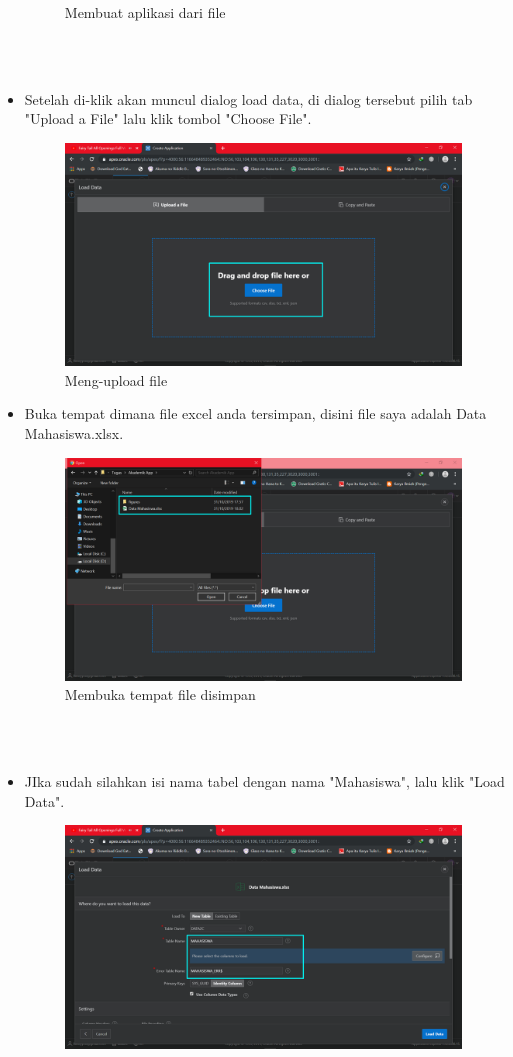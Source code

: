 \documentclass[12pt, times new roman]{article}
\begin{document}
\begin{itemize}
\begin{figure}[htbp]
	\caption{Membuat aplikasi dari file}
\end{figure}\\
\\
\item Setelah di-klik akan muncul dialog load data, di dialog tersebut pilih tab "Upload a File" lalu klik tombol "Choose File".
\begin{figure}[htbp]
	\centering
	\includegraphics[width=10.5cm]{figures/6.png}
	\caption{Meng-upload file}
\end{figure}
\item Buka tempat dimana file excel anda tersimpan, disini file saya adalah Data Mahasiswa.xlsx.
\begin{figure}[htbp]
	\centering
	\includegraphics[width=10.5cm]{figures/7.png}
	\caption{Membuka tempat file disimpan}
\end{figure}\\
\\
\item JIka sudah silahkan isi nama tabel dengan nama "Mahasiswa", lalu klik "Load Data". 
\begin{figure}[htbp]
	\centering
	\includegraphics[width=10.5cm]{figures/8.png}

\end{figure}
\end{itemize}
\end{document}
